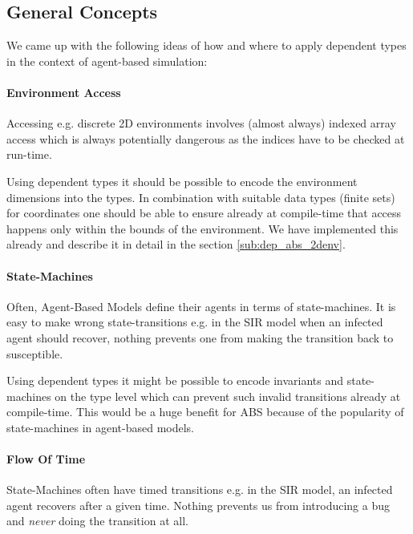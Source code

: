 \subsection{General Concepts}
\label{sub:dep_abs_generalconcepts}

We came up with the following ideas of how and where to apply dependent types in the context of agent-based simulation:



\paragraph{Environment Access}
Accessing e.g. discrete 2D environments involves (almost always) indexed array access which is always potentially dangerous as the indices have to be checked at run-time.

Using dependent types it should be possible to encode the environment dimensions into the types. In combination with suitable data types (finite sets) for coordinates one should be able to ensure already at compile-time that access happens only within the bounds of the environment. We have implemented this already and describe it in detail in the section \ref{sub:dep_abs_2denv}.

\paragraph{State-Machines}
Often, Agent-Based Models define their agents in terms of state-machines. It is easy to make wrong state-transitions e.g. in the SIR model when an infected agent should recover, nothing prevents one from making the transition back to susceptible. 

Using dependent types it might be possible to encode invariants and state-machines on the type level which can prevent such invalid transitions already at compile-time. This would be a huge benefit for ABS because of the popularity of state-machines in agent-based models.

\paragraph{Flow Of Time}
State-Machines often have timed transitions e.g. in the SIR model, an infected agent recovers after a given time. Nothing prevents us from introducing a bug and \textit{never} doing the transition at all.

